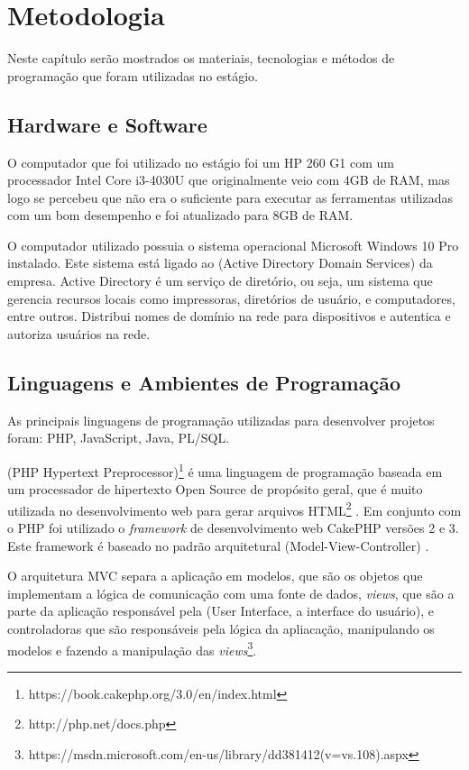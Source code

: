 \chapter{Metodologia} \label{cap:metod}

Neste capítulo serão mostrados os materiais, tecnologias e métodos de programação que foram utilizadas no estágio. 

\section{Hardware e Software}

O computador que foi utilizado no estágio foi um HP 260 G1 com um processador Intel Core i3-4030U que originalmente veio com 4GB de RAM, mas logo se percebeu que não era o suficiente para executar as ferramentas utilizadas com um bom desempenho e foi atualizado para 8GB de RAM.

O computador utilizado possuia o sistema operacional Microsoft Windows 10 Pro instalado. Este sistema está ligado ao  (Active Directory Domain Services) da empresa. Active Directory é um serviço de diretório, ou seja, um sistema que gerencia recursos locais como impressoras, diretórios de usuário, e computadores, entre outros. Distribui nomes de domínio na rede para dispositivos e autentica e autoriza usuários na rede.

\section{Linguagens e Ambientes de Programação}

As principais linguagens de programação utilizadas para desenvolver projetos foram: PHP, JavaScript, Java, PL/SQL.

 (PHP Hypertext Preprocessor)\footnote{https://book.cakephp.org/3.0/en/index.html} é uma linguagem de programação baseada em um  processador de hipertexto Open Source de propósito geral, que é muito utilizada no  desenvolvimento web para gerar arquivos HTML\footnote{http://php.net/docs.php} . Em conjunto com o PHP foi utilizado o \textit{framework} de desenvolvimento web CakePHP versões 2 e 3. Este framework é baseado no padrão arquitetural  (Model-View-Controller) \cite{php2019}.

O arquitetura MVC separa a aplicação em modelos, que são os objetos que implementam a lógica de comunicação com uma fonte de dados, \textit{views}, que são a parte da aplicação responsável pela  (User Interface, a interface do usuário), e controladoras que são responsáveis pela lógica da apliacação, manipulando os modelos e fazendo a manipulação das \textit{views}\footnote{https://msdn.microsoft.com/en-us/library/dd381412(v=vs.108).aspx}.

